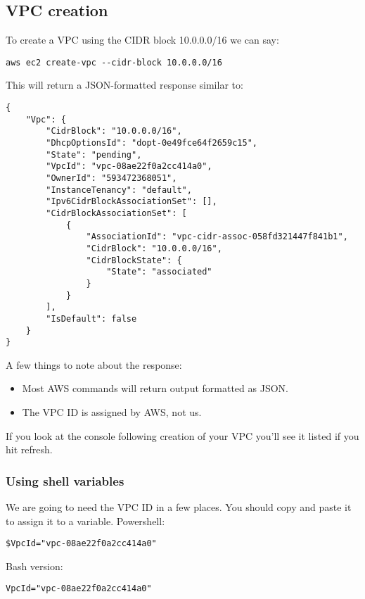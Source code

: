 \documentclass{pgnotes}
\begin{document}
\subsection{VPC creation}\label{vpc-creation}

To create a VPC using the CIDR block 10.0.0.0/16 we can say:

\begin{verbatim}
aws ec2 create-vpc --cidr-block 10.0.0.0/16
\end{verbatim}

This will return a JSON-formatted response similar to:

\begin{verbatim}
{
    "Vpc": {
        "CidrBlock": "10.0.0.0/16",
        "DhcpOptionsId": "dopt-0e49fce64f2659c15",
        "State": "pending",
        "VpcId": "vpc-08ae22f0a2cc414a0",
        "OwnerId": "593472368051",
        "InstanceTenancy": "default",
        "Ipv6CidrBlockAssociationSet": [],
        "CidrBlockAssociationSet": [
            {
                "AssociationId": "vpc-cidr-assoc-058fd321447f841b1",
                "CidrBlock": "10.0.0.0/16",
                "CidrBlockState": {
                    "State": "associated"
                }
            }
        ],
        "IsDefault": false
    }
}
\end{verbatim}

A few things to note about the response:

\begin{itemize}
\item
  Most AWS commands will return output formatted as JSON.
\item
  The VPC ID is assigned by AWS, not us.
\end{itemize}

If you look at the console following creation of your VPC you'll see it
listed if you hit refresh.

\subsubsection{Using shell variables}

We are going to need the VPC ID in a few places.
You should copy and paste it to assign it to a variable.
Powershell:

\begin{verbatim}
$VpcId="vpc-08ae22f0a2cc414a0"
\end{verbatim}

Bash version:
\begin{verbatim}
VpcId="vpc-08ae22f0a2cc414a0"
\end{verbatim}
\end{document}
